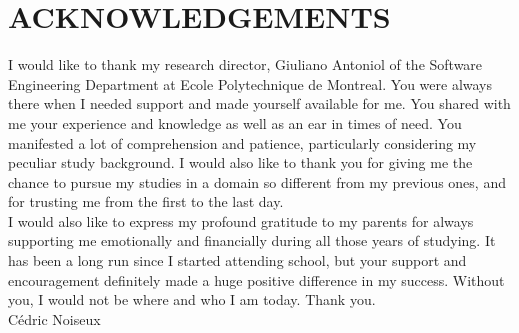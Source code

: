 %
\chapter*{ACKNOWLEDGEMENTS}\thispagestyle{headings}
%

I would like to thank my research director, Giuliano Antoniol of the Software Engineering Department at Ecole Polytechnique de Montreal. You were always there when I needed support and made yourself available for me. You shared with me your experience and knowledge as well as an ear in times of need. You manifested a lot of comprehension and patience, particularly considering my peculiar study background. I would also like to thank you for giving me the chance to pursue my studies in a domain so different from my previous ones, and for trusting me from the first to the last day. \\

I would also like to express my profound gratitude to my parents for always supporting me emotionally and financially during all those years of studying. It has been a long run since I started attending school, but your support and encouragement definitely made a huge positive difference in my success. Without you, I would not be where and who I am today. Thank you. \\

C\'{e}dric Noiseux